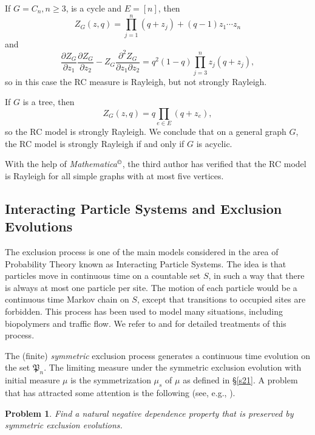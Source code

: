 \documentclass[10pt,reqno]{amsart}
\theoremstyle{plain}
\newtheorem{problem}{Problem}[section]
\theoremstyle{definition}
\theoremstyle{remark}
\newcommand{\fP}{\mathfrak{P}}
\begin{document}
If $G=C_n, n \geq 3$, is a cycle and $E=[n]$, then  
$$
Z_G(z,q)= \prod_{j=1}^n(q+z_j) +(q-1)z_1\cdots z_n 
$$
and 
$$
\frac{\partial Z_G}{\partial z_1}\frac{\partial Z_G}{\partial
z_2}-Z_G\frac{\partial^2 Z_G}
{\partial z_1\partial z_2}=  q^2(1-q)\prod_{j=3}^n z_j(q+z_j),
$$
so in this case the RC measure is Rayleigh, but not strongly Rayleigh. 

If $G$ is a tree, then 
$$
Z_G(z,q)= q\prod_{e\in E}(q+z_e),
$$
so the RC model is strongly Rayleigh. 
We conclude that on a
general graph $G$, the RC model is strongly Rayleigh if and only if $G$ is 
acyclic.  

With the help of {\em Mathematica}$^\copyright$, the
third author has verified that the RC model is Rayleigh for all simple 
graphs with at most five vertices. 

\subsection{Interacting Particle Systems and Exclusion 
Evolutions}\label{ss-ex-case}

The exclusion process is one of the main models considered in the area of
Probability Theory known as Interacting Particle Systems. The idea is 
that particles move in continuous time on a countable set $S$, in such a way 
that there is always at most one particle per site. The motion of
each particle would be a continuous time Markov chain on $S$, except that
transitions to occupied sites are forbidden. This process has been used to 
model many situations, including biopolymers and traffic flow. We refer to
\cite[Chap.~VIII]{L0} and \cite[Part 3]{L00} for detailed
treatments of this process. 

The (finite) {\em symmetric} exclusion process
generates a continuous time evolution on the set $\fP_n$. 
The limiting measure under the 
symmetric exclusion evolution with initial measure $\mu$ 
is the symmetrization $\mu_s$ of $\mu$ as defined in \S \ref{s21}. 
A problem that has attracted some attention is the following (see, e.g.,
\cite{L0,L2}).

\begin{problem}\label{p-see}
Find a natural negative dependence property that is preserved by symmetric 
exclusion evolutions.
\end{problem}
\end{document}
